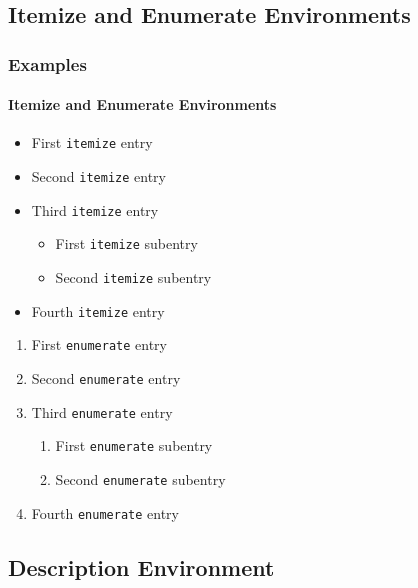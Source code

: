 \documentclass{beamer}
\begin{document}
\subsection{Itemize and Enumerate Environments}

\begin{frame}
\frametitle{Examples}
\framesubtitle{Itemize and Enumerate Environments}
  \vfill
  \begin{itemize}
  \item<1-> First \texttt{itemize} entry
  \item<2-> Second \texttt{itemize} entry
  \item<3-|alert@3> Third \texttt{itemize} entry
    \begin{itemize}
    \item<4-> First \texttt{itemize} subentry
    \item<5-|alert@5> Second \texttt{itemize} subentry
    \end{itemize}
  \item<6-> Fourth \texttt{itemize} entry
  \end{itemize}
  \vfill
  \vfill
  \begin{enumerate}
  \item<7-> First \texttt{enumerate} entry
  \item<8-|alert@8> Second \texttt{enumerate} entry
  \item<9-> Third \texttt{enumerate} entry
    \begin{enumerate}
    \item<10-> First \texttt{enumerate} subentry
    \item<11-> Second \texttt{enumerate} subentry
    \end{enumerate}
  \item<12-> Fourth \texttt{enumerate} entry
  \end{enumerate}
  \vfill
\end{frame}

\subsection{Description Environment}
\end{document}

